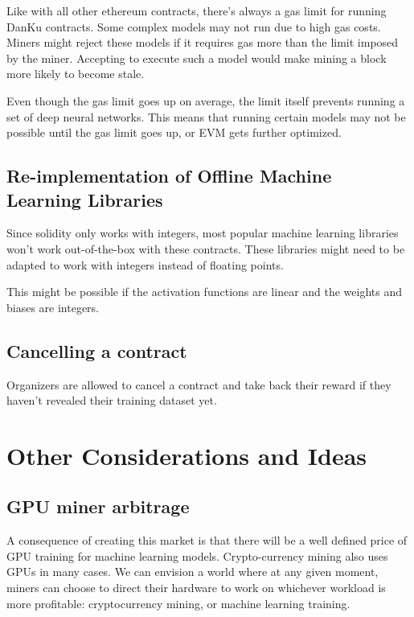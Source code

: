 \documentclass{article}
\begin{document}
Like with all other ethereum contracts, there’s always a gas limit for running DanKu contracts. Some complex models may not run due to high gas costs. Miners might reject these models if it requires gas more than the limit imposed by the miner. Accepting to execute such a model would make mining a block more likely to become stale.

Even though the gas limit goes up on average, the limit itself prevents running a set of deep neural networks. This means that running certain models may not be possible until the gas limit goes up, or EVM gets further optimized.

\subsection{Re-implementation of Offline Machine Learning Libraries}

Since solidity only works with integers, most popular machine learning libraries won’t work out-of-the-box with these contracts. These libraries might need to be adapted to work with integers instead of floating points.

This might be possible if the activation functions are linear and the weights and biases are integers.

\subsection{Cancelling a contract}

Organizers are allowed to cancel a contract and take back their reward if they haven’t revealed their training dataset yet.

\section{Other Considerations and Ideas}
\label{other_considerations_and_ideas}

\subsection{GPU miner arbitrage}
\label{gpu_miner_arbitrage}

A consequence of creating this market is that there will be a well defined price of GPU training for machine learning models. Crypto-currency mining also uses GPUs in many cases. We can envision a world where at any given moment, miners can choose to direct their hardware to work on whichever workload is more profitable: cryptocurrency mining, or machine learning training.
\end{document}

